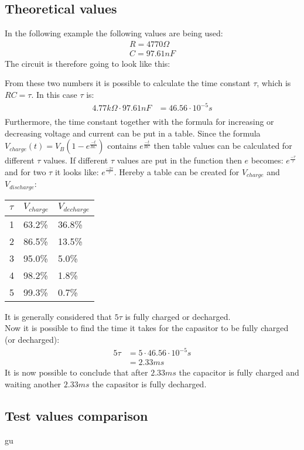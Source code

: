 \subsection{Theoretical values}
In the following example the following values are being used:
\begin{align*}
R = 4770\Omega \\
C = 97.61nF
\end{align*}
The circuit is therefore going to look like this:
\begin{figure}[H]

\end{figure}
From these two numbers it is possible to calculate the time constant $\tau$, which is $RC = \tau$. In this case $\tau$ is:
\begin{align*}
4.77 k\Omega \cdot 97.61 nF &= 46.56 \cdot 10^{-5} s \\
\end{align*}
Furthermore, the time constant together with the formula for increasing or decreasing voltage and current can be put in a table. Since the formula $V_{charge}(t)=V_B(1-e^{\frac{-t}{RC}})$ contains $e^{\frac{-t}{RC}}$ then table values can be calculated for different $\tau$ values. If different $\tau$ values are put in the function then $e$ becomes: $e^{\frac{-\tau}{\tau}}$ and for two $\tau$ it looks like: $e^{\frac{-2\tau}{\tau}}$. Hereby a table can be created for $V_{charge}$ and $V_{discharge}$:
\begin{table}[H]
\begin{tabular}{|l|l|l|}
\hline
$\tau$ & $V_{charge}$ & $V_{decharge}$ \\ \hline
1      & 63.2\%       & 36.8\%         \\ \hline
2      & 86.5\%       & 13.5\%         \\ \hline
3      & 95.0\%       & 5.0\%          \\ \hline
4      & 98.2\%       & 1.8\%          \\ \hline
5      & 99.3\%       & 0.7\%          \\ \hline
\end{tabular}
\end{table}
It is generally considered that $5\tau$ is fully charged or decharged. \\
Now it is possible to find the time it takes for the capasitor to be fully charged (or decharged):
\begin{align*}
5\tau &= 5 \cdot 46.56 \cdot 10^{-5} s \\
&= 2.33 ms
\end{align*}
It is now possible to conclude that after $2.33 ms$ the capacitor is fully charged and waiting another $2.33 ms$ the capasitor is fully decharged. 
\subsection{Test values comparison}
gu



